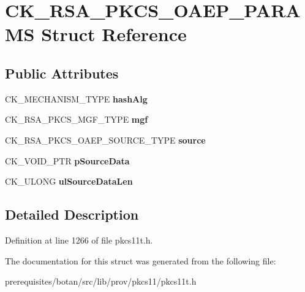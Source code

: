 \hypertarget{struct_c_k___r_s_a___p_k_c_s___o_a_e_p___p_a_r_a_m_s}{}\section{C\+K\+\_\+\+R\+S\+A\+\_\+\+P\+K\+C\+S\+\_\+\+O\+A\+E\+P\+\_\+\+P\+A\+R\+A\+MS Struct Reference}
\label{struct_c_k___r_s_a___p_k_c_s___o_a_e_p___p_a_r_a_m_s}
\subsection*{Public Attributes}
\begin{DoxyCompactItemize}
\item 
\mbox{\label{struct_c_k___r_s_a___p_k_c_s___o_a_e_p___p_a_r_a_m_s_a830f53e5a9c6b02bacaf1de3f18355ad}} 
C\+K\+\_\+\+M\+E\+C\+H\+A\+N\+I\+S\+M\+\_\+\+T\+Y\+PE {\bfseries hash\+Alg}
\item 
\mbox{\label{struct_c_k___r_s_a___p_k_c_s___o_a_e_p___p_a_r_a_m_s_ad315447d7714ea28f1a920a4b65c0c22}} 
C\+K\+\_\+\+R\+S\+A\+\_\+\+P\+K\+C\+S\+\_\+\+M\+G\+F\+\_\+\+T\+Y\+PE {\bfseries mgf}
\item 
\mbox{\label{struct_c_k___r_s_a___p_k_c_s___o_a_e_p___p_a_r_a_m_s_a9e3d19a611b80dd8e9c20d94428d90eb}} 
C\+K\+\_\+\+R\+S\+A\+\_\+\+P\+K\+C\+S\+\_\+\+O\+A\+E\+P\+\_\+\+S\+O\+U\+R\+C\+E\+\_\+\+T\+Y\+PE {\bfseries source}
\item 
\mbox{\label{struct_c_k___r_s_a___p_k_c_s___o_a_e_p___p_a_r_a_m_s_adcf064c32570d5a83461f6bdee278f87}} 
C\+K\+\_\+\+V\+O\+I\+D\+\_\+\+P\+TR {\bfseries p\+Source\+Data}
\item 
\mbox{\label{struct_c_k___r_s_a___p_k_c_s___o_a_e_p___p_a_r_a_m_s_ad292b329d2fa340bb1523547addcd9ec}} 
C\+K\+\_\+\+U\+L\+O\+NG {\bfseries ul\+Source\+Data\+Len}
\end{DoxyCompactItemize}


\subsection{Detailed Description}


Definition at line 1266 of file pkcs11t.\+h.



The documentation for this struct was generated from the following file\+:\begin{DoxyCompactItemize}
\item 
prerequisites/botan/src/lib/prov/pkcs11/pkcs11t.\+h\end{DoxyCompactItemize}
